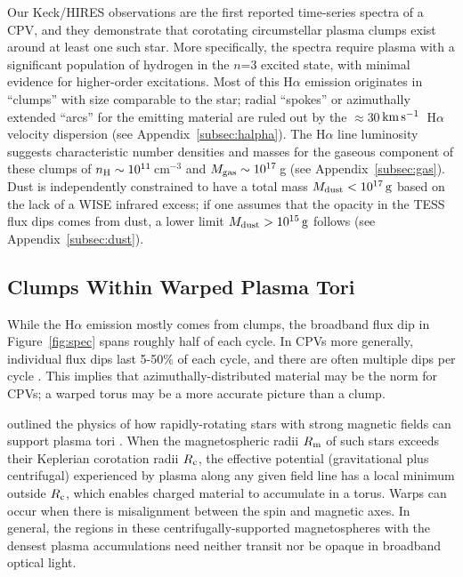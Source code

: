 \documentclass[11pt,twocolumn,tighten]{aastex7}
\newcommand{\kms}{\ensuremath{\rm km\,s^{-1}}}
\begin{document}
Our Keck/HIRES observations are the first reported time-series spectra
of a CPV, and they demonstrate that corotating circumstellar plasma
clumps exist around at least one such star.  More specifically, the
spectra require plasma with a significant population of hydrogen in
the $n$=3 excited state, with minimal evidence for
higher-order excitations.  Most of this H$\alpha$ emission originates
in ``clumps'' with size comparable to the star; radial ``spokes'' or
azimuthally extended ``arcs'' for the emitting material are ruled out
by the $\approx$30\,\kms\ H$\alpha$ velocity dispersion (see
Appendix~\ref{subsec:halpha}).  The H$\alpha$ line luminosity suggests
characteristic number densities and masses for the gaseous component
of these clumps of $n_{\rm H} \sim 10^{11}$\,cm$^{-3}$ and $M_{\rm
gas} \sim 10^{17}$\,g (see Appendix~\ref{subsec:gas}).  Dust is
independently constrained to have a total mass $M_{\rm dust} <
10^{17}\,{\rm g}$ based on the lack of a WISE infrared excess; if one
assumes that the opacity in the TESS flux dips comes from dust, a
lower limit $M_{\rm dust} > 10^{15}\,{\rm g}$ follows (see
Appendix~\ref{subsec:dust}).  


\subsection{Clumps Within Warped Plasma Tori}

While the H$\alpha$ emission mostly comes from clumps, the broadband
flux dip in Figure~\ref{fig:spec} spans roughly half of each cycle.
In CPVs more generally, individual flux dips last 5-50\% of each
cycle, and there are often multiple dips per cycle
\citep{Bouma2024}.  This implies that azimuthally-distributed
material may be the norm for CPVs; a warped torus may be a more
accurate picture than a clump.

\citet{Townsend2005} outlined the physics of how rapidly-rotating
stars with strong magnetic fields can support plasma tori
\citep[see
also][]{Nakajima1985,Ferreira2000,Petit2013,Daley-Yates2024}.  When
the magnetospheric radii $R_{\rm m}$ of such stars exceeds their
Keplerian corotation radii $R_{\rm c}$, the effective potential
  (gravitational plus centrifugal) experienced by plasma along
any given field line has a local minimum outside $R_{\rm c}$, which
enables charged material to accumulate in a torus.  Warps can occur
when there is misalignment between the spin and magnetic axes.  In
general, the regions in these centrifugally-supported
magnetospheres with the densest plasma accumulations need
neither transit nor be opaque in broadband optical light.  
\end{document}
